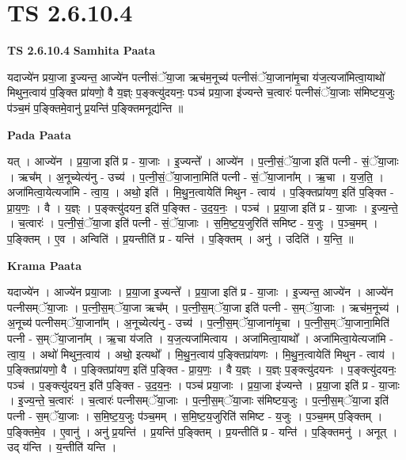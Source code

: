 \documentclass[17pt]{extarticle}
\begin{document}
\section*{ TS 2.6.10.4 }

\textbf{TS 2.6.10.4 } \newline
\textbf{Samhita Paata} \newline

यदाज्ये॑न प्रया॒जा इ॒ज्यन्त॒ आज्ये॑न पत्नीसंॅया॒जा ऋच॑म॒नूच्य॑ पत्नीसंॅया॒जाना॑मृ॒चा य॑ज॒त्यजा॑मित्वा॒याथो॑ मिथुन॒त्वाय॑ प॒ङ्क्ति प्रा॑यणो॒ वै य॒ज्ञ्ः प॒ङ्क्त्यु॑दयनः॒ पञ्च॑ प्रया॒जा इ॑ज्यन्ते च॒त्वारः॑ पत्नीसंॅया॒जाः स॑मिष्टय॒जुः प॑ञ्च॒मं प॒ङ्क्तिमे॒वानु॑ प्र॒यन्ति॑ प॒ङ्क्तिमनूद्य॑न्ति ॥ \newline

\textbf{Pada Paata} \newline

यत् । आज्ये॑न । प्र॒या॒जा इति॑ प्र - या॒जाः । इ॒ज्यन्ते᳚ । आज्ये॑न । प॒त्नी॒सं॒ॅया॒जा इति॑ पत्नी - सं॒ॅया॒जाः । ऋच᳚म् । अ॒नूच्येत्य॑नु - उच्य॑ । प॒त्नी॒सं॒ॅया॒जाना॒मिति॑ पत्नी - सं॒ॅया॒जाना᳚म् । ऋ॒चा । य॒ज॒ति॒ । अजा॑मित्वा॒येत्यजा॑मि - त्वा॒य॒ । अथो॒ इति॑ । मि॒थु॒न॒त्वायेति॑ मिथुन - त्वाय॑ । प॒ङ्क्तिप्रा॑यण॒ इति॑ प॒ङ्क्ति - प्रा॒य॒णः॒ । वै । य॒ज्ञ्ः । प॒ङ्क्त्यु॑दयन॒ इति॑ प॒ङ्क्ति - उ॒द॒य॒नः॒ । पञ्च॑ । प्र॒या॒जा इति॑ प्र - या॒जाः । इ॒ज्य॒न्ते॒ । च॒त्वारः॑ । प॒त्नी॒सं॒ॅया॒जा इति॑ पत्नी - सं॒ॅया॒जाः । स॒मि॒ष्ट॒य॒जुरिति॑ समिष्ट - य॒जुः । प॒ञ्च॒मम् । प॒ङ्क्तिम् । ए॒व । अन्विति॑ । प्र॒यन्तीति॑ प्र - यन्ति॑ । प॒ङ्क्तिम् । अनु॑ । उदिति॑ । य॒न्ति॒ ॥  \newline


\textbf{Krama Paata} \newline

यदाज्ये॑न । आज्ये॑न प्रया॒जाः । प्र॒या॒जा इ॒ज्यन्ते᳚ । प्र॒या॒जा इति॑ प्र - या॒जाः । इ॒ज्यन्त॒ आज्ये॑न । आज्ये॑न पत्नीसम्ॅया॒जाः । प॒त्नी॒स॒म्ॅया॒जा ऋच᳚म् । प॒त्नी॒स॒म्ॅया॒जा इति॑ पत्नी - स॒म्ॅया॒जाः । ऋच॑म॒नूच्य॑ । अ॒नूच्य॑ पत्नीसम्ॅया॒जाना᳚म् । अ॒नूच्येत्य॑नु - उच्य॑ । प॒त्नी॒स॒म्ॅया॒जाना॑मृ॒चा । प॒त्नी॒स॒म्ॅया॒जाना॒मिति॑ पत्नी - स॒म्ॅया॒जाना᳚म् । ऋ॒चा य॑जति । य॒ज॒त्यजा॑मित्वाय । अजा॑मित्वा॒याथो᳚ । अजा॑मित्वा॒येत्यजा॑मि - त्वा॒य॒ । अथो॑ मिथुन॒त्वाय॑ । अथो॒ इत्यथो᳚ । मि॒थु॒न॒त्वाय॑ प॒ङ्क्तिप्रा॑यणः । मि॒थु॒न॒त्वायेति॑ मिथुन - त्वाय॑ । प॒ङ्क्तिप्रा॑यणो॒ वै । प॒ङ्क्तिप्रा॑यण॒ इति॑ प॒ङ्क्ति - प्रा॒य॒णः॒ । वै य॒ज्ञ्ः । य॒ज्ञ्ः प॒ङ्क्त्यु॑दयनः । प॒ङ्क्त्यु॑दयनः॒ पञ्च॑ । प॒ङ्क्त्यु॑दयन॒ इति॑ प॒ङ्क्ति - उ॒द॒य॒नः॒ । पञ्च॑ प्रया॒जाः । प्र॒या॒जा इ॑ज्यन्ते । प्र॒या॒जा इति॑ प्र - या॒जाः । इ॒ज्य॒न्ते॒ च॒त्वारः॑ । च॒त्वारः॑ पत्नीसम्ॅया॒जाः । प॒त्नी॒स॒म्ॅया॒जाः स॑मिष्टय॒जुः । प॒त्नी॒स॒म्ॅया॒जा इति॑ पत्नी - स॒म्ॅया॒जाः । स॒मि॒ष्ट॒य॒जुः प॑ञ्च॒मम् । स॒मि॒ष्ट॒य॒जुरिति॑ समिष्ट - य॒जुः । प॒ञ्च॒मम् प॒ङ्क्तिम् । प॒ङ्क्तिमे॒व । ए॒वानु॑ । अनु॑ प्र॒यन्ति॑ । प्र॒यन्ति॑ प॒ङ्क्तिम् । प्र॒यन्तीति॑ प्र - यन्ति॑ । प॒ङ्क्तिमनु॑ । अनूत् । उद् य॑न्ति । य॒न्तीति॑ यन्ति । \newline
\end{document}
